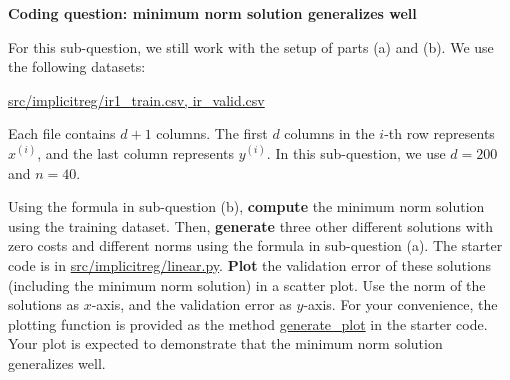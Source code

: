 \item{} 
\textbf{Coding question: minimum norm solution generalizes well}

For this sub-question, we still work with the setup of parts (a) and (b). We use the following datasets:
\begin{center}
	\url{src/implicitreg/ir1_train.csv, ir_valid.csv}
\end{center}
Each file contains $d+1$ columns. The first $d$ columns in the $i$-th row represents $x^{(i)}$, and the last column represents $y^{(i)}.$ In this sub-question, we use $d=200$ and $n=40$.

Using the formula in sub-question (b), \textbf{compute} the minimum norm solution using the training dataset. Then, \textbf{generate} three other different solutions with zero costs and different norms using the formula in sub-question (a).
The starter code is in \url{src/implicitreg/linear.py}. \textbf{Plot} the validation error of these solutions (including the minimum norm solution) in a scatter plot. 
Use the norm of the solutions as $x$-axis, and the validation error as $y$-axis. For your convenience, the plotting function is provided as the method \url{generate_plot} in the starter code. 
Your plot is expected to demonstrate that the minimum norm solution generalizes well.